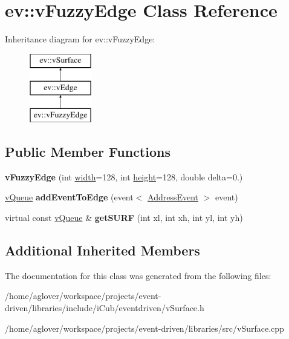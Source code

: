 \hypertarget{classev_1_1vFuzzyEdge}{}\section{ev\+:\+:v\+Fuzzy\+Edge Class Reference}
\label{classev_1_1vFuzzyEdge}
Inheritance diagram for ev\+:\+:v\+Fuzzy\+Edge\+:\begin{figure}[H]
\begin{center}
\leavevmode
\includegraphics[height=3.000000cm]{classev_1_1vFuzzyEdge}
\end{center}
\end{figure}
\subsection*{Public Member Functions}
\begin{DoxyCompactItemize}
\item 
{\bfseries v\+Fuzzy\+Edge} (int \hyperlink{classev_1_1vSurface_a9666b7ae2580bf5647f65306f911825e}{width}=128, int \hyperlink{classev_1_1vSurface_ab3cf3df2f4fcb7eb5d89e0c5d1a5eeff}{height}=128, double delta=0.)\hypertarget{classev_1_1vFuzzyEdge_a4fa6e20618a528a591baf2f098cace53}{}\label{classev_1_1vFuzzyEdge_a4fa6e20618a528a591baf2f098cace53}

\item 
\hyperlink{classev_1_1vQueue}{v\+Queue} {\bfseries add\+Event\+To\+Edge} (event$<$ \hyperlink{classev_1_1AddressEvent}{Address\+Event} $>$ event)\hypertarget{classev_1_1vFuzzyEdge_a61803b783119945df5c130c12d99e9c2}{}\label{classev_1_1vFuzzyEdge_a61803b783119945df5c130c12d99e9c2}

\item 
virtual const \hyperlink{classev_1_1vQueue}{v\+Queue} \& {\bfseries get\+S\+U\+RF} (int xl, int xh, int yl, int yh)\hypertarget{classev_1_1vFuzzyEdge_a8a495c6c2d878c7e047feebdd0a90b35}{}\label{classev_1_1vFuzzyEdge_a8a495c6c2d878c7e047feebdd0a90b35}

\end{DoxyCompactItemize}
\subsection*{Additional Inherited Members}


The documentation for this class was generated from the following files\+:\begin{DoxyCompactItemize}
\item 
/home/aglover/workspace/projects/event-\/driven/libraries/include/i\+Cub/eventdriven/v\+Surface.\+h\item 
/home/aglover/workspace/projects/event-\/driven/libraries/src/v\+Surface.\+cpp\end{DoxyCompactItemize}
